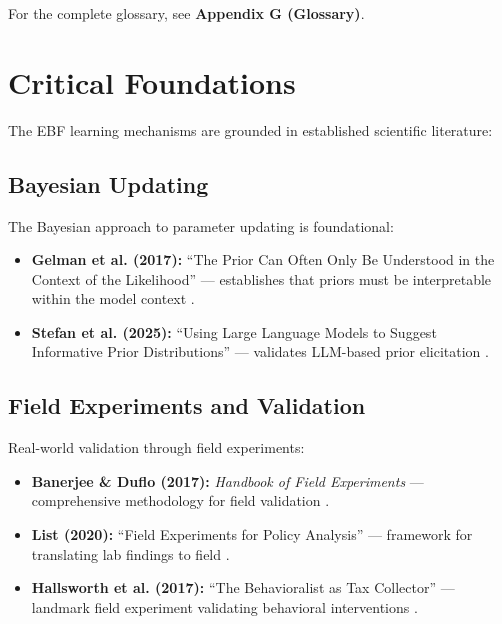 For the complete glossary, see \textbf{Appendix G (Glossary)}.


\section{Critical Foundations}
\label{sec:ref-ebf-foundations}

The EBF learning mechanisms are grounded in established scientific literature:

\subsection{Bayesian Updating}

The Bayesian approach to parameter updating is foundational:
\begin{itemize}[nosep]
\item \textbf{Gelman et al. (2017):} ``The Prior Can Often Only Be Understood
      in the Context of the Likelihood'' --- establishes that priors must be
      interpretable within the model context \citep{gelman2017prior}.
\item \textbf{Stefan et al. (2025):} ``Using Large Language Models to Suggest
      Informative Prior Distributions'' --- validates LLM-based prior
      elicitation \citep{scientificreports2025llmpriors}.
\end{itemize}

\subsection{Field Experiments and Validation}

Real-world validation through field experiments:
\begin{itemize}[nosep]
\item \textbf{Banerjee \& Duflo (2017):} \textit{Handbook of Field Experiments}
      --- comprehensive methodology for field validation \citep{banerjee2017handbook}.
\item \textbf{List (2020):} ``Field Experiments for Policy Analysis'' ---
      framework for translating lab findings to field \citep{list2020field}.
\item \textbf{Hallsworth et al. (2017):} ``The Behavioralist as Tax Collector''
      --- landmark field experiment validating behavioral interventions
      \citep{hallsworth2017}.
\end{itemize}

